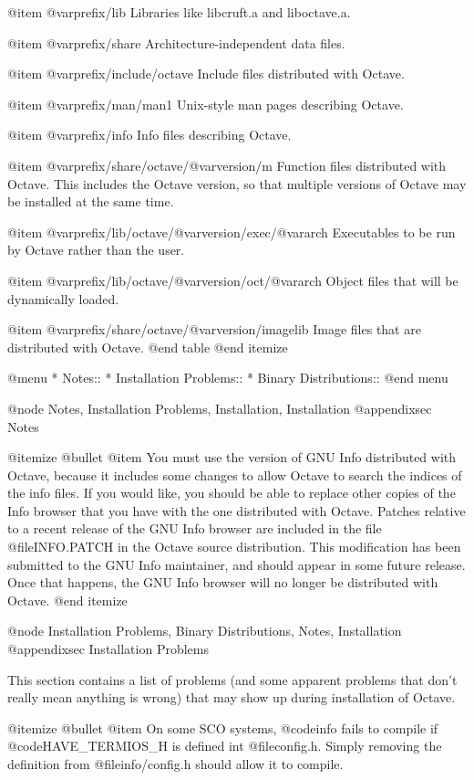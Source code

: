 @item @var{prefix}/lib
Libraries like libcruft.a and liboctave.a.

@item @var{prefix}/share
Architecture-independent data files.

@item @var{prefix}/include/octave
Include files distributed with Octave.

@item @var{prefix}/man/man1
Unix-style man pages describing Octave.

@item @var{prefix}/info
Info files describing Octave.

@item @var{prefix}/share/octave/@var{version}/m
Function files distributed with Octave.  This includes the Octave
version, so that multiple versions of Octave may be installed at the
same time.

@item @var{prefix}/lib/octave/@var{version}/exec/@var{arch}
Executables to be run by Octave rather than the user.

@item @var{prefix}/lib/octave/@var{version}/oct/@var{arch}
Object files that will be dynamically loaded.

@item @var{prefix}/share/octave/@var{version}/imagelib
Image files that are distributed with Octave.
@end table
@end itemize

@menu
* Notes::                       
* Installation Problems::       
* Binary Distributions::        
@end menu

@node Notes, Installation Problems, Installation, Installation
@appendixsec Notes

@itemize @bullet
@item
You must use the version of GNU Info distributed with Octave, because it
includes some changes to allow Octave to search the indices of the info
files.  If you would like, you should be able to replace other copies of
the Info browser that you have with the one distributed with Octave.
Patches relative to a recent release of the GNU Info browser are
included in the file @file{INFO.PATCH} in the Octave source
distribution.  This modification has been submitted to the GNU Info
maintainer, and should appear in some future release.  Once that
happens, the GNU Info browser will no longer be distributed with Octave.
@end itemize

@node Installation Problems, Binary Distributions, Notes, Installation
@appendixsec Installation Problems

This section contains a list of problems (and some apparent problems
that don't really mean anything is wrong) that may show up during
installation of Octave.

@itemize @bullet
@item
On some SCO systems, @code{info} fails to compile if
@code{HAVE_TERMIOS_H} is defined int @file{config.h}.  Simply removing
the definition from @file{info/config.h} should allow it to compile.

